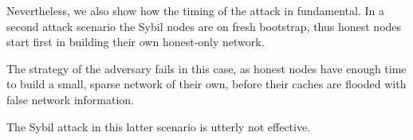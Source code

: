 Nevertheless, we also show how the timing of the attack in fundamental. In a second attack scenario the Sybil nodes are on fresh bootstrap, thus honest nodes start first in building their own honest-only network.

The strategy of the adversary fails in this case, as honest nodes have enough time to build a small, sparse network of their own, before their caches are flooded with false network information.

The Sybil attack in this latter scenario is utterly not effective.



